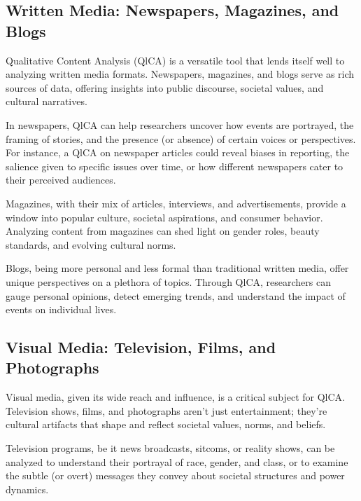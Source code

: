 \documentclass[
  b5paper]{book}
\begin{document}
\hypertarget{written-media-newspapers-magazines-and-blogs}{%
\subsection*{Written Media: Newspapers, Magazines, and Blogs}\label{written-media-newspapers-magazines-and-blogs}}

Qualitative Content Analysis (QlCA) is a versatile tool that lends itself well to analyzing written media formats. Newspapers, magazines, and blogs serve as rich sources of data, offering insights into public discourse, societal values, and cultural narratives.

In newspapers, QlCA can help researchers uncover how events are portrayed, the framing of stories, and the presence (or absence) of certain voices or perspectives. For instance, a QlCA on newspaper articles could reveal biases in reporting, the salience given to specific issues over time, or how different newspapers cater to their perceived audiences.

Magazines, with their mix of articles, interviews, and advertisements, provide a window into popular culture, societal aspirations, and consumer behavior. Analyzing content from magazines can shed light on gender roles, beauty standards, and evolving cultural norms.

Blogs, being more personal and less formal than traditional written media, offer unique perspectives on a plethora of topics. Through QlCA, researchers can gauge personal opinions, detect emerging trends, and understand the impact of events on individual lives.

\hypertarget{visual-media-television-films-and-photographs}{%
\subsection*{Visual Media: Television, Films, and Photographs}\label{visual-media-television-films-and-photographs}}

Visual media, given its wide reach and influence, is a critical subject for QlCA. Television shows, films, and photographs aren't just entertainment; they're cultural artifacts that shape and reflect societal values, norms, and beliefs.

Television programs, be it news broadcasts, sitcoms, or reality shows, can be analyzed to understand their portrayal of race, gender, and class, or to examine the subtle (or overt) messages they convey about societal structures and power dynamics.
\end{document}
